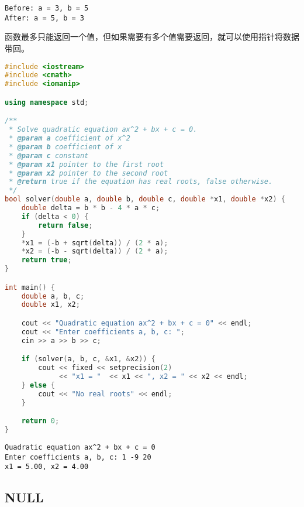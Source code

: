 \begin{tcolorbox}
    \begin{verbatim}
Before: a = 3, b = 5
After: a = 5, b = 3
	\end{verbatim}
\end{tcolorbox}

函数最多只能返回一个值，但如果需要有多个值需要返回，就可以使用指针将数据带回。\\


\begin{lstlisting}[language=C++]
#include <iostream>
#include <cmath>
#include <iomanip>

using namespace std;

/**
 * Solve quadratic equation ax^2 + bx + c = 0.
 * @param a coefficient of x^2
 * @param b coefficient of x
 * @param c constant
 * @param x1 pointer to the first root
 * @param x2 pointer to the second root
 * @return true if the equation has real roots, false otherwise.
 */
bool solver(double a, double b, double c, double *x1, double *x2) {
    double delta = b * b - 4 * a * c;
    if (delta < 0) {
        return false;
    }
    *x1 = (-b + sqrt(delta)) / (2 * a);
    *x2 = (-b - sqrt(delta)) / (2 * a);
    return true;
}

int main() {
    double a, b, c;
    double x1, x2;

    cout << "Quadratic equation ax^2 + bx + c = 0" << endl;
    cout << "Enter coefficients a, b, c: ";
    cin >> a >> b >> c;

    if (solver(a, b, c, &x1, &x2)) {
        cout << fixed << setprecision(2) 
             << "x1 = "  << x1 << ", x2 = " << x2 << endl;
    } else {
        cout << "No real roots" << endl;
    }

    return 0;
}
\end{lstlisting}

\begin{tcolorbox}
    \begin{verbatim}
Quadratic equation ax^2 + bx + c = 0
Enter coefficients a, b, c: 1 -9 20
x1 = 5.00, x2 = 4.00
	\end{verbatim}
\end{tcolorbox}

\vspace{0.5cm}

\subsection{NULL}

